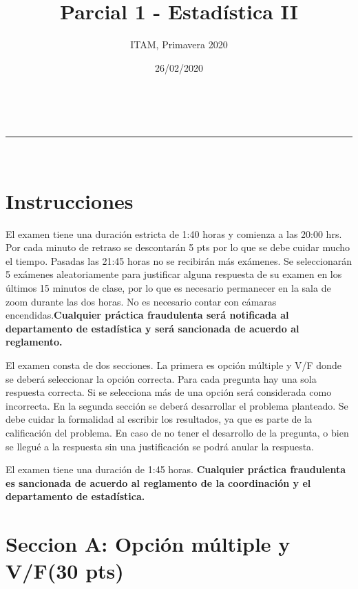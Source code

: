 \documentclass[addpoints]{exam}
\makeatletter
\newcommand{\linia}{\rule{\linewidth}{0.5pt}}
\theoremstyle{mytheor}
\renewcommand{\maketitle}{
    \begin{center}
    \vspace{2ex}
    {\huge \textsc{\@title}}
    \vspace{1ex}
    \\
    \linia\\
    \@author \hfill \@date
    \vspace{4ex}
    \end{center}
  }
\makeatother
\begin{document}
  
  \title{Parcial 1 - Estadística II}
  
  \author{ITAM, Primavera 2020}
  
  \date{26/02/2020}
  
  \maketitle
  
  \section*{Instrucciones}
  
  
El examen tiene una duración estricta de 1:40 horas y comienza a las 20:00 hrs. Por cada minuto de retraso se descontarán 5 pts por lo que se debe cuidar mucho el tiempo. Pasadas las 21:45 horas no se recibirán más exámenes. Se seleccionarán 5 exámenes aleatoriamente para justificar alguna respuesta de su examen en los últimos 15 minutos de clase, por lo que es necesario permanecer en la sala de zoom durante las dos horas. No es necesario contar con cámaras encendidas.\textbf{Cualquier práctica fraudulenta será notificada al departamento de estadística y será sancionada de acuerdo al reglamento.} 

El examen consta de dos secciones. La primera es opción múltiple y V/F donde se deberá seleccionar la opción correcta. Para cada pregunta hay una sola respuesta correcta. Si se selecciona más de una opción será considerada como incorrecta. En la segunda sección se deberá desarrollar el problema planteado. Se debe cuidar la formalidad al escribir los resultados, ya que es parte de la calificación del problema. En caso de no tener el desarrollo de la pregunta, o bien se llegué a la respuesta sin una justificación se podrá anular la respuesta. 
  
  \vspace{10pt}
  
El examen tiene una duración de 1:45 horas. \textbf{Cualquier práctica fraudulenta es sancionada de acuerdo al reglamento de la coordinación y el departamento de estadística.} 
  
  \section*{Seccion A: Opción múltiple y V/F(30 pts)}
  
\end{document}
